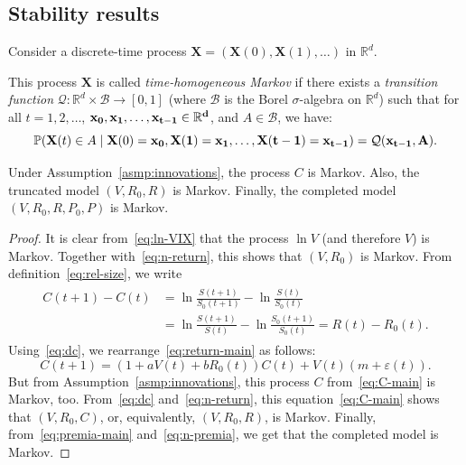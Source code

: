 \documentclass[12pt]{amsart}
\begin{document}
\subsection{Stability results} Consider a discrete-time process $\mathbf{X} = (\mathbf{X}(0), \mathbf{X}(1), \ldots)$ in $\mathbb R^d$.

\begin{defn}
This process $\mathbf{X}$ is called {\it time-homogeneous Markov} if there exists a {\it transition function} $\mathcal Q : \mathbb R^d \times \mathcal B \to [0, 1]$ (where $\mathcal B$ is the Borel $\sigma$-algebra on $\mathbb R^d$) such that for all $t = 1, 2, \ldots$, $\bf{x}_0, \bf{x}_1, \ldots, \bf{x}_{t-1} \in \mathbb R^d$, and $A \in \mathcal B$, we have:
$$
\mathbb P(\mathbf{X}(t) \in A\mid \mathbf{X}(0) = \bf{x}_0, \mathbf{X}(1) = \bf{x}_1, \ldots, \mathbf{X}(t-1) = \bf{x}_{t-1}) = \mathcal Q(\bf{x}_{t-1}, A).
$$
\end{defn}

\begin{lemma} Under Assumption~\ref{asmp:innovations}, the process $C$ is Markov. Also, the truncated model $(V, R_0, R)$ is Markov. Finally, the completed model $(V, R_0, R, P_0, P)$ is Markov. 
\end{lemma}

\begin{proof} It is clear from~\eqref{eq:ln-VIX} that the process $\ln V$ (and therefore $V$) is Markov. Together with~\eqref{eq:n-return}, this shows that $(V, R_0)$ is Markov. From definition~\eqref{eq:rel-size}, we write 
\begin{align}
\label{eq:dc}
\begin{split}
C(t+1) - C(t) &= \ln\frac{S(t+1)}{S_0(t+1)} - \ln\frac{S(t)}{S_0(t)} \\ & = \ln\frac{S(t+1)}{S(t)} - \ln\frac{S_0(t+1)}{S_0(t)} = R(t) - R_0(t).
\end{split}
\end{align}
Using~\eqref{eq:dc}, we rearrange~\eqref{eq:return-main} as follows:
\begin{equation}
\label{eq:C-main}
C(t+1) = (1 + aV(t) + bR_0(t))C(t) + V(t)(m + \varepsilon(t)).
\end{equation}
But from Assumption~\ref{asmp:innovations}, this process $C$ from~\eqref{eq:C-main} is Markov, too. From~\eqref{eq:dc} and~\eqref{eq:n-return}, this equation~\eqref{eq:C-main} shows that $(V, R_0, C)$, or, equivalently, $(V, R_0, R)$, is Markov. Finally, from~\eqref{eq:premia-main} and~\eqref{eq:n-premia}, we get that the completed model is Markov. 
\end{proof}
\end{document}
